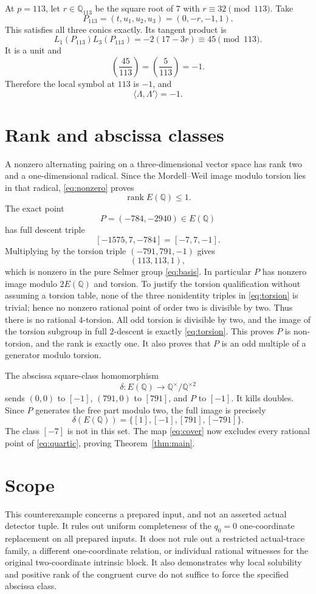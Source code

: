 \documentclass[11pt]{article}
\newcommand{\Q}{\mathbb Q}
\begin{document}
At $p=113$, let $r\in\Q_{113}$ be the square root of $7$ with $r\equiv32\pmod{113}$. Take
\[
 P_{113}=(t,u_1,u_2,u_3)=(0,-r,-1,1).
\]
This satisfies all three conics exactly. Its tangent product is
\[
 L_1(P_{113})L_3(P_{113})=-2(17-3r)
 \equiv45\pmod{113}.
\]
It is a unit and
\[
 \left(\frac{45}{113}\right)=\left(\frac5{113}\right)=-1.
\]
Therefore the local symbol at $113$ is $-1$, and
\begin{equation}\label{eq:nonzero}
 \boxed{\langle\Lambda,\Lambda'\rangle=-1.}
\end{equation}

\section{Rank and abscissa classes}
A nonzero alternating pairing on a three-dimensional vector space has rank two and a one-dimensional radical. Since the Mordell--Weil image modulo torsion lies in that radical, \eqref{eq:nonzero} proves
\[
 \operatorname{rank}E(\Q)\le1.
\]
The exact point
\[
 P=(-784,-2940)\in E(\Q)
\]
has full descent triple
\[
 [-1575,7,-784]=[-7,7,-1].
\]
Multiplying by the torsion triple $(-791,791,-1)$ gives
\[
 (113,113,1),
\]
which is nonzero in the pure Selmer group \eqref{eq:basis}. In particular $P$ has nonzero image modulo $2E(\Q)$ and torsion. To justify the torsion qualification without assuming a torsion table, none of the three nonidentity triples in \eqref{eq:torsion} is trivial; hence no nonzero rational point of order two is divisible by two. Thus there is no rational $4$-torsion. All odd torsion is divisible by two, and the image of the torsion subgroup in full $2$-descent is exactly \eqref{eq:torsion}. This proves $P$ is non-torsion, and the rank is exactly one. It also proves that $P$ is an odd multiple of a generator modulo torsion.

The abscissa square-class homomorphism
\[
 \delta:E(\Q)\to\Q^\times/\Q^{\times2}
\]
sends $(0,0)$ to $[-1]$, $(791,0)$ to $[791]$, and $P$ to $[-1]$. It kills doubles. Since $P$ generates the free part modulo two, the full image is precisely
\[
 \delta(E(\Q))=\{[1],[-1],[791],[-791]\}.
\]
The class $[-7]$ is not in this set. The map \eqref{eq:cover} now excludes every rational point of \eqref{eq:quartic}, proving Theorem~\ref{thm:main}.

\section{Scope}
This counterexample concerns a prepared input, and not an asserted actual detector tuple. It rules out uniform completeness of the $q_0=0$ one-coordinate replacement on all prepared inputs. It does not rule out a restricted actual-trace family, a different one-coordinate relation, or individual rational witnesses for the original two-coordinate intrinsic block. It also demonstrates why local solubility and positive rank of the congruent curve do not suffice to force the specified abscissa class.
\end{document}
